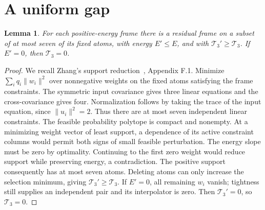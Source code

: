 \documentclass[10pt]{article}
\newtheorem{lemma}[theorem]{Lemma}
\newcommand{\T}{\mathcal T_3}
\begin{document}
\section{A uniform gap}
\begin{lemma}\label{seven}
For each positive-energy frame there is a residual frame on a subset of
at most seven of its fixed atoms, with energy $E'\le E$, and with
$\T'\ge\T$. If $E'=0$, then $\T=0$.
\end{lemma}
\begin{proof}
We recall Zhang's support reduction~\cite{zhang}, Appendix F.1.
Minimize $\sum_i q_i\|w_i\|^2$ over nonnegative weights on the fixed
atoms satisfying the frame constraints. The symmetric input covariance gives three linear equations and the
cross-covariance gives four. Normalization follows by taking the trace
of the input equation, since $\|u_i\|^2=2$. Thus there are at most
seven independent linear constraints.
The feasible probability polytope is compact and nonempty. At a minimizing
weight vector of least support, a dependence of its active constraint
columns would permit both signs of small feasible perturbation. The energy
slope must be zero by optimality. Continuing to the first zero weight would
reduce support while preserving energy, a contradiction. The positive
support consequently has at most seven atoms.
Deleting atoms can only increase the selection minimum, giving $\T'\ge\T$.
If $E'=0$, all remaining $w_i$ vanish; tightness still supplies an independent
pair and its interpolator is zero. Then $\T' =0$, so $\T=0$.
\end{proof}
\end{document}
